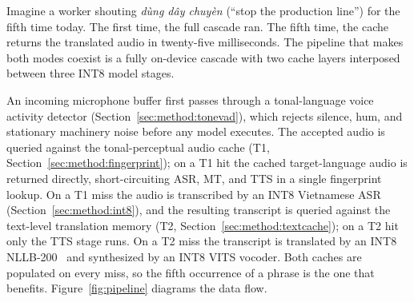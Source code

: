 \documentclass[a4paper,fleqn]{cas-dc}
\begin{document}
Imagine a worker shouting \emph{d\`ung d\^ay chuy\`en} (``stop the production line'') for the fifth time today. The first time, the full cascade ran. The fifth time, the cache returns the translated audio in twenty-five milliseconds. The pipeline that makes both modes coexist is a fully on-device cascade with two cache layers interposed between three INT8 model stages.

An incoming microphone buffer first passes through a tonal-language voice activity detector (Section~\ref{sec:method:tonevad}), which rejects silence, hum, and stationary machinery noise before any model executes. The accepted audio is queried against the tonal-perceptual audio cache (T1, Section~\ref{sec:method:fingerprint}); on a T1 hit the cached target-language audio is returned directly, short-circuiting ASR, MT, and TTS in a single fingerprint lookup. On a T1 miss the audio is transcribed by an INT8 Vietnamese ASR (Section~\ref{sec:method:int8}), and the resulting transcript is queried against the text-level translation memory (T2, Section~\ref{sec:method:textcache}); on a T2 hit only the TTS stage runs. On a T2 miss the transcript is translated by an INT8 NLLB-200~\citep{nllb2022} and synthesized by an INT8 VITS vocoder. Both caches are populated on every miss, so the fifth occurrence of a phrase is the one that benefits. Figure~\ref{fig:pipeline} diagrams the data flow.
\end{document}
